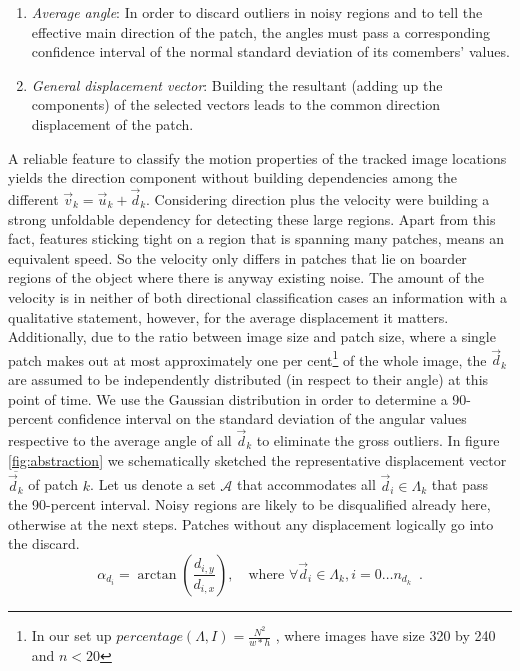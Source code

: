 \documentclass[conference]{IEEEtran}
\begin{document}
\begin{enumerate}
	\item \textit{Average angle}: In order to discard outliers in noisy regions and to tell the effective main direction of the patch, the angles must pass a corresponding confidence interval of the normal standard deviation of its comembers' values.
	\item \textit{General displacement vector}: Building the resultant (adding up the components) of the selected vectors leads to the common direction displacement of the patch.
\end{enumerate}
%
A reliable feature to classify the motion properties of the tracked image locations yields the direction component without building dependencies among the different $ \vec{v}_k = \vec{u}_k + \vec{d}_k $. Considering direction plus the velocity were building a strong unfoldable dependency for detecting these large regions. Apart from this fact, features sticking tight on a region that is spanning many patches, means an equivalent speed. So the velocity only differs in patches that lie on boarder regions of the object where there is anyway existing noise. The amount of the velocity is in neither of both directional classification cases an information with a qualitative statement, however, for the average displacement it matters. Additionally, due to the ratio between image size and patch size, where a single patch makes out at most approximately one per cent\footnote{In our set up $ percentage \left(  \Lambda, I \right) = \frac{N^2}{w*h}$ , where images have size 320 by 240 and $n < 20$ } of the whole image, the $ \vec{d}_k $ are assumed to be independently distributed  (in respect to their angle) at this point of time. We use the Gaussian distribution in order to determine a 90-percent confidence interval on the standard deviation of the angular values respective to the average angle of all $\vec{d}_k $ to eliminate the gross outliers. In figure \ref{fig:abstraction} we schematically sketched the representative displacement vector $\overline{\vec{d}_k}$ of patch $k$. Let us denote a set $\mathcal{A}$ that accommodates all $\vec{d}_i \in \Lambda_k$ that pass the 90-percent interval.%
Noisy regions are likely to be disqualified already here, otherwise at the next steps. Patches without any displacement logically go into the discard. 
\begin{equation}
	\alpha_{d_i} = \arctan{ \left( \frac{d_{i,y} }{d_{i,x} } \right)}, \quad \mbox{where } \forall \vec{d}_i \in \Lambda_{k} , i=0 \ldots n_{d_k} \enspace .
\end{equation} 
\end{document}
